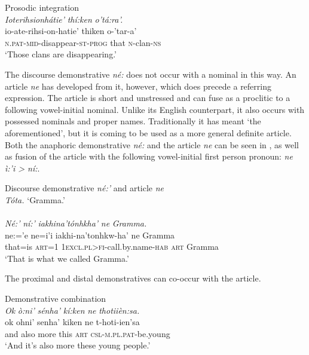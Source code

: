 \documentclass[output=paper]{langscibook}
\begin{document}
\ea%
    \label{ex:mithun:8}
Prosodic integration\\
\glll \textit{Ioterihsionhátie’}              \textit{thí:ken}  \textit{o’tá:ra’.}\\
io-ate-rihsi-on-hatie’          thiken    o-’tar-a’\\
\textsc{n.pat-mid-}disappear-\textsc{st-prog}  that      \textsc{n-}clan-\textsc{ns}\\
\glt ‘Those clans are disappearing.’       \\ 
\z

The discourse demonstrative \textit{né:} does not occur with a nominal in this way. An article \textit{ne} has developed from it, however, which does precede a referring expression. The article is short and unstressed and can fuse as a proclitic to a following vowel-initial nominal. Unlike its English counterpart, it also occurs with possessed nominals and proper names. Traditionally it has meant ‘the aforementioned’, but it is coming to be used as a more general definite article. Both the anaphoric demonstrative \textit{né:} and the article \textit{ne} can be seen in , as well as fusion of the article with the following vowel-initial first person pronoun:  \textit{ne ì:’i > ní:}.

\ea%
\label{ex:mithun:9}
Discourse demonstrative \textit{né:’} and article \textit{ne} \\
\textit{Tóta.}
\glt ‘Gramma.’\\~\\

\glll \textit{Né:’}      \textit{ní:’}      \textit{iakhina’tónhkha’}               \textit{ne}    \textit{Gramma.}\\
ne:=’e    ne=i’i    iakhi-na’tonhkw-ha’           ne    Gramma\\
that=is  \textsc{art=1}    \textsc{1excl.pl>fi}{}-call.by.name-\textsc{hab}   \textsc{art}    Gramma\\
\glt ‘That is what we called Gramma.’\\
\z

The proximal and distal demonstratives can co-occur with the article.

\ea%
\label{ex:mithun:10}
Demonstrative combination\\
\glll \textit{Ok}    \textit{ò:ni’}  \textit{sénha’}    \textit{kí:ken}     \textit{ne} \textit{thotiièn:sa.}\\
ok    ohni’  senha’    kiken     ne  t-hoti-ien’sa\\
and    also    more    this       \textsc{art}  \textsc{csl-m.pl.pat-}be.young\\
\glt ‘And it’s also more these young people.’\\
\z
\end{document}
